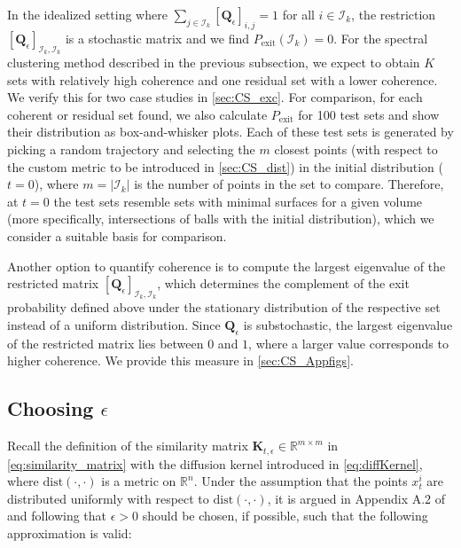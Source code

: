 In the idealized setting where $\sum_{j\in  \mathcal{I}_k} \left[\mathbf{Q}_\epsilon\right]_{i,j} = 1$ for all $i \in \mathcal{I}_k$, the restriction $\left[\mathbf{Q}_\epsilon\right]_{\mathcal{I}_k, \mathcal{I}_k}$ is a stochastic matrix and we find  $ P_\text{exit}(\mathcal{I}_k)= 0$. For the spectral clustering method described in the previous subsection, we expect to obtain $K$ sets with relatively high coherence and one residual set with a lower coherence. We verify this for two case studies in \cref{sec:CS_exc}. %
For comparison, for each coherent or residual set found, we also calculate $P_{\text{exit}}$ for 100 test sets and show their distribution as box-and-whisker plots. Each of these test sets is generated by picking a random trajectory and selecting the $m$ closest points (with respect to the custom metric to be introduced in \cref{sec:CS_dist}) in the initial distribution ($t=0$), where $m = |\mathcal{I}_k|$ is the number of points in the set to compare. Therefore, at $t=0$ the test sets resemble sets with minimal surfaces for a given volume (more specifically, intersections of balls with the initial distribution), which we consider a suitable basis for comparison.

Another option to quantify coherence is to compute the largest eigenvalue of the restricted matrix $\left[\mathbf{Q}_\epsilon\right]_{\mathcal{I}_k, \mathcal{I}_k}$, which determines the complement of the exit probability defined above under the stationary distribution of the respective set instead of a uniform distribution. Since $\mathbf{Q}_\epsilon$ is substochastic, the largest eigenvalue of the restricted matrix lies between $0$ and $1$, where a larger value corresponds to higher coherence. We provide this measure in \cref{sec:CS_Appfigs}.

\subsection{Choosing $\epsilon$} \label{sec:CS_eps}
Recall the definition of the similarity matrix $\mathbf{K}_{t, \epsilon}\in \mathbb{R}^{m\times m}$ in \cref{eq:similarity_matrix} with the diffusion kernel introduced in \cref{eq:diffKernel},
where $\text{dist}(\cdot, \cdot)$ is a metric on $\mathbb{R}^n$.
Under the assumption that the points $x_t^i$ are distributed uniformly with respect to $\text{dist}(\cdot, \cdot)$, it is argued in Appendix A.2 of \textcite{koltaiDiffusionMapsEmbedding2020} and following \textcite{berryVariableBandwidthDiffusion2016, coifmanGraphLaplacianTomography2008} that $\epsilon>0$ should be chosen, if possible, such that the following approximation is valid:


